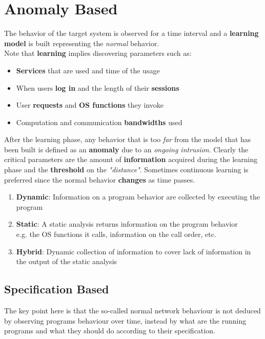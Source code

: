 \section{Anomaly Based}
The behavior of the target system is observed for a time interval and a \textbf{learning model} is built representing the \textit{normal} behavior.\\
Note that \textbf{learning} implies discovering parameters such as:
\begin{itemize}
   \item \textbf{Services} that are used and time of the usage
   \item When users \textbf{log in} and the length of their \textbf{sessions}
   \item User \textbf{requests} and \textbf{OS functions} they invoke
   \item Computation and communication \textbf{bandwidths} used
\end{itemize}
After the learning phase, any behavior that is too \textit{far} from the model that has
been built is defined as an \textbf{anomaly} due to an \textit{ongoing intrusion}.
Clearly the critical parameters are the amount of \textbf{information} acquired during the learning phase and the \textbf{threshold} on the \textit{"distance"}.
Sometimes continuous learning is preferred since the normal behavior \textbf{changes} as time passes.

\begin{enumerate}
   \item \textbf{Dynamic}:
   Information on a program behavior are collected by executing the program
   \item \textbf{Static}:
   A static analysis returns information on the program behavior\\
   e.g. the OS functions it calls, information on the call order, etc.
   \item \textbf{Hybrid}:
   Dynamic collection of information to cover lack of information in the output of the static analysis
\end{enumerate}

\subsection{Specification Based}
The key point here is that the so-called normal network behaviour is not deduced by observing programs behaviour over time,
instead by what are the running programs and what they should do according to their specification.

